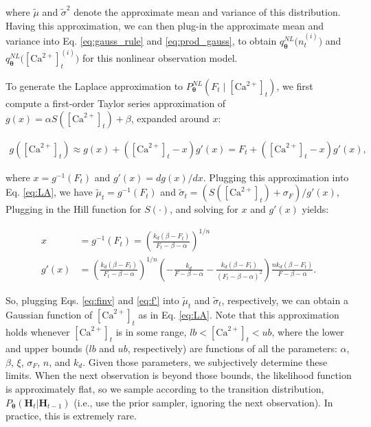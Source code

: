 \documentclass[10pt]{article}
\providecommand{\ve}[1]{\boldsymbol{#1}}
\providecommand{\ve}[1]{\boldsymbol{#1}}
\newcommand{\thetn}{\ve{\theta}}
\newcommand{\p}{P_{\thetn}}
\newcommand{\Ca}{[\text{Ca}^{2+}]}
\begin{document}
\noindent where $\widetilde{\mu}$ and $\widetilde{\sigma}^2$ denote the approximate mean and variance of this distribution. Having this approximation, we can then plug-in the approximate mean and variance into Eq. \ref{eq:gauss_rule} and \ref{eq:prod_gauss}, to obtain $q_{\thetn}^{NL}\big(n_t^{(i)}\big)$ and $q_{\thetn}^{NL}\big(\Ca_t^{(i)}\big)$ for this nonlinear observation model.

To generate the Laplace approximation to $\p^{NL}(F_t \mid \Ca_t)$, we first compute a first-order Taylor series approximation of $g(x)=\alpha S(\Ca_t)+\beta$, expanded around $x$:

\begin{align}
g(\Ca_t) \approx g(x) + (\Ca_t - x) g'(x) = F_t + (\Ca_t - x) g'(x),
\end{align}

\noindent where $x = g^{-1}(F_t)$ and $g'(x)=dg(x)/dx$. Plugging this approximation into Eq. \ref{eq:LA}, we have $\widetilde{\mu}_t=g^{-1}(F_t)$ and $\widetilde{\sigma}_t=(S(\Ca_t)+\sigma_F)/g'(x)$, 
%
%
Plugging in the Hill function for $S(\cdot)$, and solving for $x$ and $g'(x)$ yields:

\begin{align} \label{eq:finv}
x &= g^{-1}(F_t) =  \left(\frac{k_d (\beta - F_t)}{F_t - \beta - \alpha}\right)^{1/n}\\ \label{eq:f'}
g'(x) &= \left(\frac{k_d (\beta -F_t)}{F_t - \beta - \alpha}\right)^{1/n} \left(-\frac{k_d}{F-\beta-\alpha}-\frac{k_d(\beta-F_t)}{(F_t-\beta-\alpha)^2}\right) \frac{n k_d (\beta - F_t)}{F-\beta-\alpha}.
\end{align}

\noindent So, plugging Eqs. \ref{eq:finv} and \ref{eq:f'} into $\widetilde{\mu}_t$ and $\widetilde{\sigma}_t$, respectively, we can obtain a Gaussian function of $\Ca_t$ as in Eq. \ref{eq:LA}. Note that this approximation holds whenever $\Ca_t$ is in some range, $lb<\Ca_t<ub$, where the lower and upper bounds ($lb$ and $ub$, respectively) are functions of all the parameters: $\alpha$, $\beta$, $\xi$, $\sigma_F$, $n$, and $k_d$. Given those parameters, we subjectively determine these limits.  When the next observation is beyond those bounds, the likelihood function is approximately flat, so we sample according to the transition distribution, $\p(\ve{H}_t | \ve{H}_{t-1})$  (i.e., use the prior sampler, ignoring the next observation).  In practice, this is extremely rare.
\end{document}

